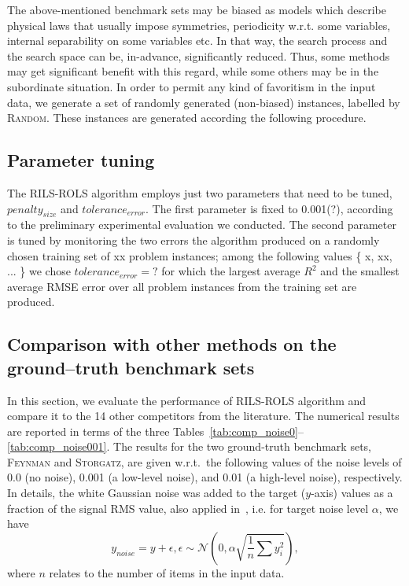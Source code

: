\documentclass[a4paper,12pt]{elsarticle}
\begin{document}
The above-mentioned benchmark sets may be biased as models which describe physical laws that usually impose   symmetries, periodicity w.r.t. some variables, internal separability on some variables etc. In that way, the search process and the search space can be, in-advance, significantly reduced. Thus, some methods may get significant benefit with this regard, while some others may be in the subordinate situation. 
In order to permit any kind of favoritism in the input data, we generate a set of randomly generated (non-biased) instances, labelled by \textsc{Random}. These instances are generated according the following procedure. 


\subsection{Parameter tuning}
The \textsc{RILS}-\textsc{ROLS} algorithm employs just two parameters that need to be tuned, $penalty_{size}$ and $tolerance_{error}$. The first parameter is fixed to 0.001(?), according to the preliminary experimental evaluation we conducted. The second parameter is tuned by monitoring the two errors the algorithm produced on a randomly chosen training set of xx problem instances; among the following values \{ x, xx, ... \} we chose $tolerance_{error}=?$ for which the largest average $R^2$ and the smallest average RMSE error over all problem instances from the training set are produced. %


\subsection{Comparison with other methods on the   ground--truth benchmark sets}
In this section, we evaluate the performance of \textsc{RILS-ROLS} algorithm and compare it to the 14 other competitors from the literature. The numerical results are reported in terms of the three Tables~\ref{tab:comp_noise0}--\ref{tab:comp_noise001}. The results for the two ground-truth benchmark sets, \textsc{Feynman} and \textsc{Storgatz}, are given w.r.t.\   the following values of the noise levels of 0.0 (no noise), 0.001 (a low-level noise), and 0.01 (a high-level noise), respectively. In details, the white Gaussian noise was added to the target ($y$-axis) values as a fraction of the signal RMS value, also applied in~\cite{la2021contemporary}, i.e. for target noise level $\alpha$, we have
$$ y_{noise} = y + \epsilon, \epsilon \sim \mathcal{N}\left(0, \alpha \sqrt{\frac{1}{n} \sum {y_i^2}}\right),$$
where $n$ relates to the number of items in the input data.
\end{document}
